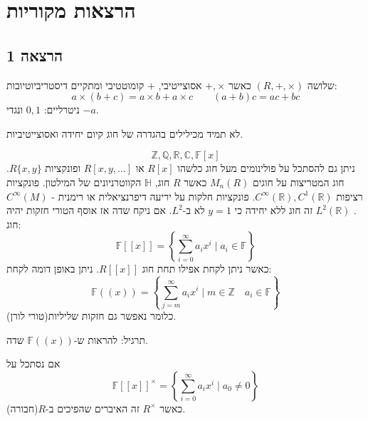 \documentclass{tstextbook}
\begin{document}
\section{הרצאות מקוריות}

\subsection{הרצאה 1}

\begin{definition}[חוג]
שלושה \((R,+,\times)\) כאשר \(+,\times\) אסוצייטיבי, \(+\) קומוטטיבי ומתקיים דיסטריביוטיובות:
$$a\times(b+c)=a\times b+a\times c \qquad (a+b)c=ac+bc$$
ניטרליים: \(0,1\) ונגדי \(-a\).

\end{definition}
\begin{remark}
לא תמיד מכילילים בהגדרה של חוג קיום יחידה ואסוצייטיביות.

\end{remark}
\begin{example}
$$\mathbb{Z},\mathbb{Q} ,\mathbb{R},\mathbb{C}, \mathbb{F} [x]$$
ניתן גם להסתכל על פולינומים מעל חוג כלשהו \(R[x]\) או \(R[x,y, \dots]\) ופונקציות \(R\{ x,y \}\). חוג המטריצות על חוגים \(M_{n}(R)\) כאשר \(R\) חוג, \(\mathbb{H}\) הקווטרניונים של המילטון. פונקציות רציפות \(C^{\infty}(\mathbb{R}),C^{1}(\mathbb{R})\). פונקציות חלקות על יריעה דיפרנציאלית או רימנית - \(C^{\infty}(M)\). \(L^{2}(\mathbb{R})\) זה חוג ללא יחידה כי \(y=1\) לא ב-\(L^{2}\).
אם ניקח שדה אז אוסף הטורי חזקות יהיה חוג:
$$\mathbb{F} [[x]]=\left\{  \sum_{i=0}^{\infty} a_{i}x^{i}\mid a_{i} \in \mathbb{F}  \right\}$$
כאשר ניתן לקחת אפילו תחת חוג \(R[[x]]\). ניתן באופן דומה לקחת:
$$\mathbb{F} ((x))=\left\{  \sum_{j=m}^{\infty} a_{i}x^{i} \mid m \in \mathbb{Z}\quad a_{i}\in \mathbb{F}   \right\}$$
כלומר נאפשר גם חזקות שליליות(טורי לורן).

\end{example}
תרגיל:
להראות ש-\(\mathbb{F}((x))\) שדה. 

אם נסתכל על 
$$\mathbb{F}[[x]]^{\times}=\left\{  \sum_{i=0}^{\infty} a_{i}x^{i}\mid a_{0}\neq 0 \right\}$$
כאשר \(R^{\times}\) זה האיברים שהפיכים ב-\(R\)(חבורה).
\end{document}
